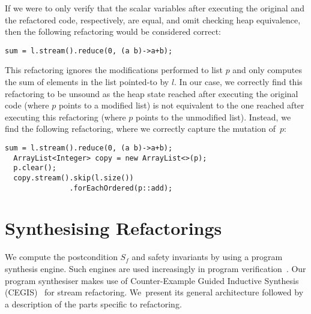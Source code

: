 \documentclass[runningheads,a4paper]{llncs}
\begin{document}
%
If we were to only verify that the scalar variables after executing the
original and the refactored code, respectively, are equal, and omit checking
heap equivalence, then the following refactoring would be considered
correct:

\begin{lstlisting}[mathescape=true]
  sum = l.stream().reduce(0, (a b)->a+b);
\end{lstlisting}

This refactoring ignores the modifications performed to list $p$ and only
computes the sum of elements in the list pointed-to by $l$.  In our case, we
correctly find this refactoring to be unsound as the heap state
reached after executing the original code (where $p$ points to a modified
list) is not equivalent to the one reached after executing this refactoring
(where $p$ points to the unmodified list).  Instead, we find the following
refactoring, where we correctly capture the mutation of~$p$:

\begin{lstlisting}[mathescape=true]
  sum = l.stream().reduce(0, (a b)->a+b);
  ArrayList<Integer> copy = new ArrayList<>(p);
  p.clear();
  copy.stream().skip(l.size())
               .forEachOrdered(p::add);
\end{lstlisting}



\section{Synthesising Refactorings} \label{sec:prog.synthesis}







We compute the postcondition $S_f$ and safety invariants by using a
program synthesis engine.  Such engines are used increasingly in program
verification~\cite{DBLP:conf/cav/0001A14,DBLP:conf/lpar/DavidKL15}.  Our
program synthesiser makes use of Counter-Example Guided Inductive Synthesis
(CEGIS)~\cite{sketch} for stream refactoring.  We~present its general
architecture followed by a description of the parts specific to refactoring.
\end{document}
